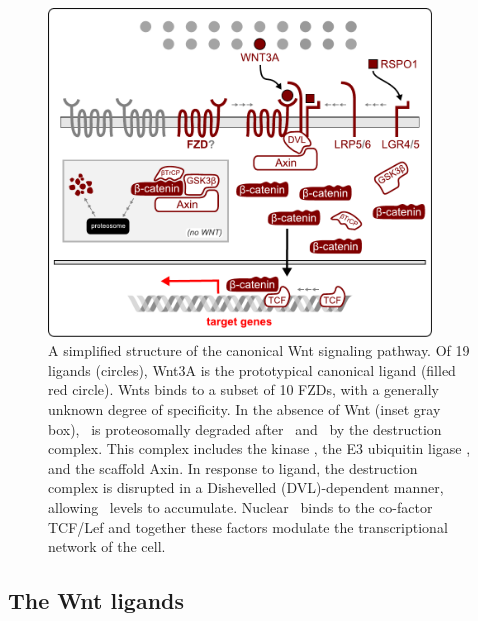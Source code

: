   \begin{figure}[!bt]
  \centering
  \includegraphics[width=4in]{FIGS/pathways/wnt.pdf}
  {\singlespacing 
  \caption[Structure of the canonical Wnt signaling pathway]
          {A simplified structure of the canonical Wnt signaling pathway.
          Of 19 ligands (circles), Wnt3A is the prototypical canonical ligand
          (filled red circle).
          Wnts binds to a subset of 10 FZDs, with a generally unknown degree
          of specificity. In the absence of
          Wnt (inset gray box), \bcat\ is proteosomally degraded after
          \pn\ and \ubn\ by the destruction
          complex. This complex includes the kinase \gsk, the E3 ubiquitin ligase
          , and the scaffold Axin.
          In response to ligand, the destruction complex
          is disrupted in a Dishevelled (DVL)-dependent manner,
          allowing \bcat\ levels to accumulate.
          Nuclear \bcat\ binds to the co-factor TCF/Lef and together
          these factors modulate the transcriptional network of the cell.
  }
  \label{fig:pathways:wnt}}
  \end{figure}

  
  
  
  
  
\subsection{The Wnt ligands}
\label{pathways:wnt:wnt}


